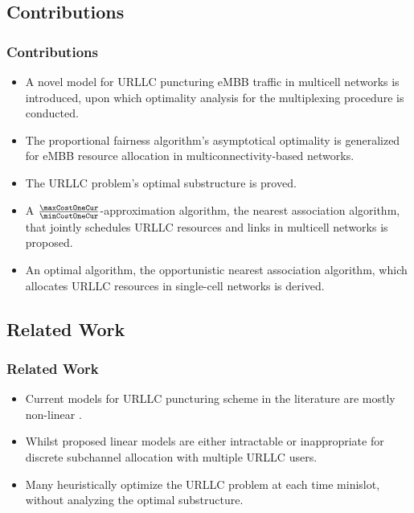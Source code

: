 \subsection{Contributions}
\begin{frame}
  \frametitle{Contributions}
  \begin{itemize}
    \item A novel  model for URLLC puncturing eMBB traffic in multicell networks is introduced, upon which optimality analysis for the multiplexing procedure is conducted.
    \item The proportional fairness algorithm's asymptotical optimality \cite{KW02} is generalized for eMBB resource allocation in multiconnectivity-based networks.
    \item The URLLC problem's optimal substructure is proved.
    \item A $\frac{\maxCostOneCur}{\minCostOneCur}$-approximation algorithm, the nearest association algorithm, that jointly schedules URLLC resources and links in multicell networks is proposed.
    \item An optimal algorithm, the opportunistic nearest association algorithm, which allocates URLLC resources in single-cell networks is derived.
  \end{itemize}
\end{frame}

\subsection{Related Work}
\begin{frame}
  \frametitle{Related Work}
  \begin{itemize}
    \item Current models for URLLC puncturing scheme in the literature are mostly non-linear \cite{BMATAMHH21}.
    \item Whilst proposed linear models are either intractable \cite{YZR21} or inappropriate \cite{AVS20} for discrete subchannel allocation with multiple URLLC users.
    \item Many \cite{BMATAMHH21, YZR21} heuristically optimize the URLLC problem at each time minislot, without analyzing the optimal substructure.
  \end{itemize}
\end{frame}

